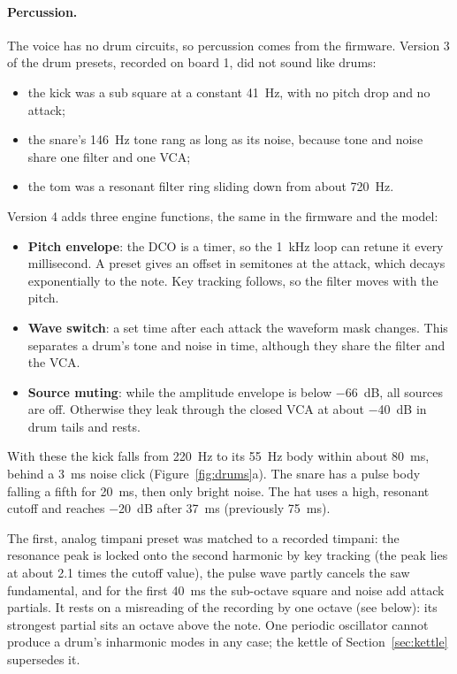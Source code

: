 \documentclass[11pt,a4paper]{article}
\begin{document}
\paragraph{Percussion.} The voice has no drum circuits, so percussion comes from the firmware. Version 3 of
the drum presets, recorded on board 1, did not sound like drums:
\begin{itemize}
  \item the kick was a sub square at a constant \SI{41}{Hz}, with no pitch drop and no attack;
  \item the snare's \SI{146}{Hz} tone rang as long as its noise, because tone and noise share one filter and
    one VCA;
  \item the tom was a resonant filter ring sliding down from about \SI{720}{Hz}.
\end{itemize}
Version 4 adds three engine functions, the same in the firmware and the model:
\begin{itemize}
  \item \textbf{Pitch envelope}: the DCO is a timer, so the \SI{1}{kHz} loop can retune it every
    millisecond. A preset gives an offset in semitones at the attack, which decays exponentially to the note.
    Key tracking follows, so the filter moves with the pitch.
  \item \textbf{Wave switch}: a set time after each attack the waveform mask changes. This separates a drum's
    tone and noise in time, although they share the filter and the VCA.
  \item \textbf{Source muting}: while the amplitude envelope is below \SI{-66}{dB}, all sources are off.
    Otherwise they leak through the closed VCA at about \SI{-40}{dB} in drum tails and rests.
\end{itemize}
With these the kick falls from \SI{220}{Hz} to its \SI{55}{Hz} body within about \SI{80}{ms}, behind a
\SI{3}{ms} noise click (Figure~\ref{fig:drums}a). The snare has a pulse body falling a fifth for \SI{20}{ms},
then only bright noise. The hat uses a high, resonant cutoff and reaches \SI{-20}{dB} after \SI{37}{ms}
(previously \SI{75}{ms}).

The first, analog timpani preset was matched to a recorded timpani: the resonance peak is locked onto the
second harmonic by key tracking (the peak lies at about 2.1 times the cutoff value), the pulse wave partly
cancels the saw fundamental, and for the first \SI{40}{ms} the sub-octave square and noise add attack
partials. It rests on a misreading of the recording by one octave (see below): its strongest partial sits an
octave above the note. One periodic oscillator cannot produce a drum's inharmonic modes in any case; the
kettle of Section~\ref{sec:kettle} supersedes it.
\end{document}

